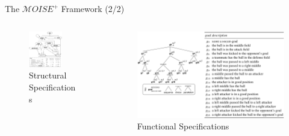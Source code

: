 \documentclass[9pt, aspectratio=169]{beamer}
\begin{document}
\begin{frame}{The $\mathcal{M}OISE^+$ Framework (2/2)}


  \vspace{-2.5ex}

  \begin{columns}
    \hspace{-16ex}
    \begin{column}{0.5\textwidth}
      \centering
      \begin{figure}[H]
        \includegraphics[width=0.7\textwidth]{figures/soccer_ss.png}
        \caption*{Structural Specifications}
      \end{figure}
    \end{column}
    \hspace{-20ex}
    \begin{column}{0.5\textwidth}
      \centering
      \begin{figure}[H]
        \centering
        \includegraphics[width=1.2\textwidth]{figures/soccer_fs.png}
        \caption*{Functional Specifications}
      \end{figure}
    \end{column}
  \end{columns}


\end{frame}
\end{document}
